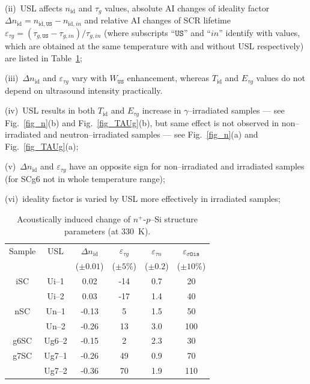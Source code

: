 \documentclass[aip,jap, amsmath,amssymb,reprint]{revtex4-1}
\begin{document}
\noindent
(ii)~USL affects $n_{\mathrm{id}}$ and $\tau_g$ values, absolute AI changes of ideality factor $\Delta n_{\mathrm{id}}=n_{\mathrm{id},\mathtt{US}}-n_{\mathrm{id},in}$ and
relative AI changes of SCR lifetime $\varepsilon_{\tau g}=(\tau_{g,\mathtt{US}}-\tau_{g,in})/\tau_{g,in}$
(where subscripts ``$\mathtt{US}$'' and ``$in$'' identify with values,
which are obtained at the same temperature with and without USL respectively)
are listed in Table~\ref{tabAIchange};

\noindent
(iii)~$\Delta n_{\mathrm{id}}$ and $\varepsilon_{\tau g}$ vary with $W_{\mathtt{US}}$ enhancement, whereas $T_{\mathrm{id}}$ and $E_{\tau g}$ values do not depend on ultrasound intensity practically.


\noindent
(iv)~USL results in both $T_{\mathrm{id}}$ and $E_{\tau g}$ increase in $\gamma$--irradiated samples --- see Fig.~\ref{fig_n}(b) and Fig.~\ref{fig_TAUg}(b), but same effect is not observed in non--irradiated and neutron--irradiated samples --- see Fig.~\ref{fig_n}(a) and Fig.~\ref{fig_TAUg}(a);

\noindent
(v)~$\Delta n_{\mathrm{id}}$ and $\varepsilon_{\tau g}$ have an opposite sign for non--irradiated and irradiated samples
(for SCg6 not in whole temperature range);

\noindent
(vi)~ideality factor is varied by USL more effectively in irradiated samples;






\begin{table}
\caption{\label{tabAIchange}Acoustically induced change of $n^+$-$p$--Si structure parameters (at 330~K).
}
\begin{ruledtabular}
\begin{tabular}{cccccc}
Sample&USL&$\Delta n_{\mathrm{id}}$ &$\varepsilon_{\tau g}$ &$\varepsilon_{\tau n}$ &$\varepsilon_{\sigma\mathtt{Dis}}$ \\
&&\mbox{($\pm0.01$)}&($\pm5$\%)&($\pm0.2$)&($\pm10$\%)\\
\hline
iSC&Ui--1&0.02&-14&0.7&20\\
&Ui--2&0.03&-17&1.4&40\\
nSC&Un--1&-0.13&5&1.5&50\\
&Un--2&-0.26&13&3.0&100\\
g6SC&Ug6--2&-0.15&2&2.3&30\\
g7SC&Ug7--1&-0.26&49&0.9&70\\
&Ug7--2&-0.36&70&1.9&110\\
\end{tabular}
\end{ruledtabular}
\end{table}
\end{document}
